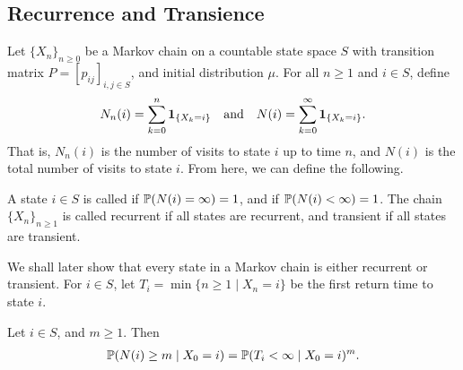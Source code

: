 \subsection{Recurrence and Transience}

Let $\{X_{n}\}_{n \geq 0}$ be a Markov chain on a countable state space $S$ with transition matrix $P = [p_{ij}]_{i,j \in S}$, and initial distribution $\mu$. For all $n \geq 1$ and $i \in S$, define
\begin{align}
    N_{n}(i) = \sum_{k=0}^{n} \textbf{1}_{\{X_{k} = i\}} \quad \text{and} \quad N(i) = \sum_{k=0}^{\infty} \textbf{1}_{\{X_{k} = i\}}.
\end{align}
That is, $N_{n}(i)$ is the number of visits to state $i$ up to time $n$, and $N(i)$ is the total number of visits to state $i$. From here, we can define the following.
\begin{definition}
    A state $i \in S$ is called  if $\mathbb{P}(N(i) = \infty) = 1$, and  if $\mathbb{P}(N(i) < \infty) = 1$. The chain $\{X_{n}\}_{n \geq 1}$ is called recurrent if all states are recurrent, and transient if all states are transient.
\end{definition}
We shall later show that every state in a Markov chain is either recurrent or transient. For $i \in S$, let $T_{i} = \min\{n \geq 1 \mid X_{n} = i\}$ be the first return time to state $i$. 

\begin{lemma}
    Let $i \in S$, and $m \geq 1$. Then
    \begin{align}
        \mathbb{P}(N(i) \geq m \mid X_{0} = i) = \mathbb{P}(T_{i} < \infty \mid X_{0} = i)^{m}.
    \end{align}
\end{lemma}

